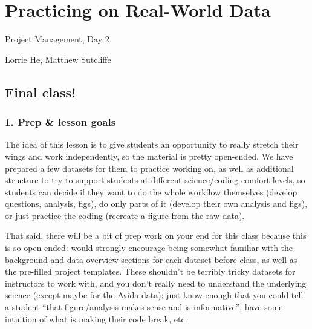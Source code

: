 \documentclass[
  letterpaper,
  DIV=11,
  numbers=noendperiod]{scrreprt}
\begin{document}

\chapter{Practicing on Real-World
Data}\label{practicing-on-real-world-data}

Project Management, Day 2

Lorrie He, Matthew Sutcliffe

\hfill\break

\section{Final class!}\label{final-class}

\begin{tcolorbox}[enhanced jigsaw, bottomtitle=1mm, bottomrule=.15mm, toprule=.15mm, opacityback=0, leftrule=.75mm, breakable, colback=white, toptitle=1mm, left=2mm, coltitle=black, titlerule=0mm, opacitybacktitle=0.6, title=\textcolor{quarto-callout-note-color}{\faInfo}\hspace{0.5em}{Instructor notes}, rightrule=.15mm, arc=.35mm, colframe=quarto-callout-note-color-frame, colbacktitle=quarto-callout-note-color!10!white]

\subsection{1. Prep \& lesson goals}

The idea of this lesson is to give students an opportunity to really
stretch their wings and work independently, so the material is pretty
open-ended. We have prepared a few datasets for them to practice working
on, as well as additional structure to try to support students at
different science/coding comfort levels, so students can decide if they
want to do the whole workflow themselves (develop questions, analysis,
figs), do only parts of it (develop their own analysis and figs), or
just practice the coding (recreate a figure from the raw data).

That said, there will be a bit of prep work on your end for this class
because this is so open-ended: would strongly encourage being somewhat
familiar with the background and data overview sections for each dataset
before class, as well as the pre-filled project templates. These
shouldn't be terribly tricky datasets for instructors to work with, and
you don't really need to understand the underlying science (except maybe
for the Avida data): just know enough that you could tell a student
``that figure/analysis makes sense and is informative'', have some
intuition of what is making their code break, etc.


\end{tcolorbox}
\end{document}
